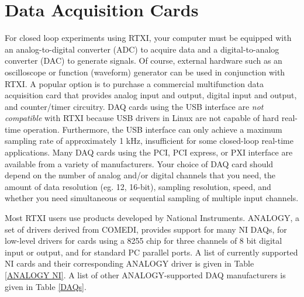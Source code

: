 \section{Data Acquisition Cards}
\label{dataacquisition}

For closed loop experiments using RTXI, your computer must be equipped with an analog-to-digital converter (ADC) to acquire data and a digital-to-analog converter (DAC) to generate signals. Of course, external hardware such as an oscilloscope or function (waveform) generator can be used in conjunction with RTXI. A popular option is to purchase a commercial multifunction data acquisition card that provides analog input and output, digital input and output, and counter/timer circuitry. DAQ cards using the USB interface are \attention \emph{not compatible} with RTXI because USB drivers in Linux are not capable of hard real-time operation. Furthermore, the USB interface can only achieve a maximum sampling rate of approximately 1 kHz, insufficient for some closed-loop real-time applications. Many DAQ cards using the PCI, PCI express, or PXI interface are available from a variety of manufacturers. Your choice of DAQ card should depend on the number of analog and/or digital channels that you need, the amount of data resolution (eg. 12, 16-bit), sampling resolution, speed, and whether you need simultaneous or sequential sampling of multiple input channels. 

Most RTXI users use products developed by National Instruments. ANALOGY, a set of drivers derived from COMEDI, provides support for many NI DAQs, for low-level drivers for cards using a 8255 chip for three channels of 8 bit digital input or output, and for standard PC parallel ports. A list of currently supported NI cards and their corresponding ANALOGY driver is given in Table \ref{ANALOGY NI}. A list of other ANALOGY-supported DAQ manufacturers is given in Table \ref{DAQs}.

